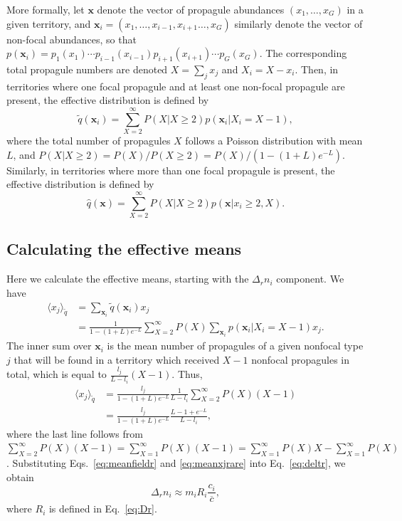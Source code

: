 \documentclass[12pt]{article}
\begin{document}
More formally, let ${\mathbf x}$ denote the vector of propagule abundances $(x_1,\ldots,x_G)$ in a given territory, and ${\mathbf x_i}=(x_1,\ldots,x_{i-1},x_{i+1}\ldots,x_G)$ similarly denote the vector of non-focal abundances, so that $p({\mathbf x_i})=p_1(x_1)\cdots p_{i-1}(x_{i-1})p_{i+1}(x_{i+1})\cdots p_G(x_G)$. The corresponding total propagule numbers are denoted $X=\sum_j x_j$ and $X_i=X-x_i$. Then, in territories where one focal propagule and at least one non-focal propagule are present, the effective distribution is defined by 
\begin{equation}
\tilde{q}({\mathbf x_i})=\sum_{X=2}^{\infty}P(X|X\geq 2) p({\mathbf x_i}|X_i=X-1),
\end{equation}
where the total number of propagules $X$ follows a Poisson distribution with mean $L$, and $P(X|X\geq 2)=P(X)/P(X\geq 2)=P(X)/(1-(1+L)e^{-L})$. Similarly, in territories where more than one focal propagule is present, the effective distribution is defined by 
\begin{equation}
\hat{q}({\mathbf x})=\sum_{X=2}^{\infty}P(X|X\geq 2) p({\mathbf x}|x_i\geq 2, X).
\end{equation}
 
\subsection*{Calculating the effective means}

Here we calculate the effective means, starting with the $\Delta_r n_i$ component. We have
\begin{align}
\langle x_j \rangle_{\tilde{q}}&=\sum_{\mathbf x_i} \tilde{q}({\mathbf x_i})x_j\nonumber\\
&=\frac{1}{1-(1+L)e^{-L}}\sum_{X=2}^{\infty} P(X) \sum_{\mathbf x_i} p({\mathbf x_i}|X_i=X-1)x_j.
\label{eq:raremonster1}
\end{align}
The inner sum over ${\mathbf x_i}$ is the mean number of propagules of a given nonfocal type $j$ that will be found in a territory which received $X-1$ nonfocal propagules in total, which is equal to $\frac{l_j}{L-l_i}(X-1)$. Thus, 
\begin{align}
\langle x_j \rangle_{\tilde{q}}&=\frac{l_j}{1-(1+L)e^{-L}}\frac{1}{L-l_i}\sum_{X=2}^{\infty} P(X) (X-1)\nonumber\\
&=\frac{l_j}{1-(1+L)e^{-L}}\frac{L-1+e^{-L}}{L-l_i},
\label{eq:meanxjrare}
\end{align}
where the last line follows from $\sum_{X=2}^{\infty} P(X)(X-1)=\sum_{X=1}^{\infty} P(X)(X-1)=\sum_{X=1}^{\infty} P(X)X-\sum_{X=1}^{\infty}P(X)$. Substituting Eqs.~\eqref{eq:meanfieldr} and \eqref{eq:meanxjrare} into Eq.~\eqref{eq:deltr}, we obtain
\begin{equation}
\Delta_r n_i\approx m_i R_i\frac{c_i}{\overline{c}}, \label{eq:deltrfinal}
\end{equation}
where $R_i$ is defined in Eq.~\eqref{eq:Dr}.
\end{document}
